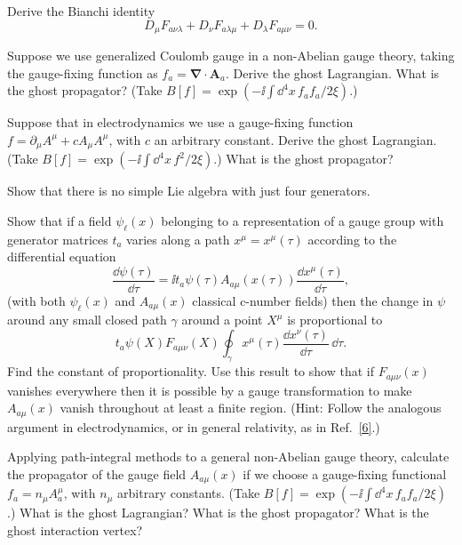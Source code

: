 
\begin{enumerate}
   Derive the Bianchi identity
  \[
    D_\mu F_{a\nu\lambda}+D_\nu F_{a\lambda\mu}
    +D_\lambda F_{a\mu\nu}=0.
  \]

   Suppose we use generalized Coulomb gauge in a non-Abelian gauge theory, taking the gauge-fixing function as $f_a=\boldsymbol\nabla\cdot\mathbf A_a$. Derive the ghost Lagrangian. What is the ghost propagator? (Take $B[f]=\exp(-\ii\int \dd^4x\,f_a f_a/2\xi)$.)

   Suppose that in electrodynamics we use a gauge-fixing function $f=\partial_\mu A^\mu+cA_\mu A^\mu$, with $c$ an arbitrary constant. Derive the ghost Lagrangian.\\
  (Take $B[f]=\exp(-\ii\int \dd^4x\,f^2/2\xi)$.) What is the ghost propagator?

   Show that there is no simple Lie algebra with just four generators.

   Show that if a field $\psi_\ell(x)$ belonging to a representation of a gauge group with generator matrices $t_a$ varies along a path $x^\mu=x^\mu(\tau)$ according to the differential equation
  \[
    \frac{\dd\psi(\tau)}{\dd\tau}
    =\ii t_a\psi(\tau)A_{a\mu}(x(\tau))\frac{\dd x^\mu(\tau)}{\dd\tau},
  \]
  (with both $\psi_\ell(x)$ and $A_{a\mu}(x)$ classical c-number fields) then the change in $\psi$ around any small closed path $\gamma$ around a point $X^\mu$ is proportional to
  \[
    t_a\psi(X)F_{a\mu\nu}(X)
    \oint_\gamma x^\mu(\tau)\frac{\dd x^\nu(\tau)}{\dd\tau}\,\dd\tau.
  \]
  Find the constant of proportionality. Use this result to show that if $F_{a\mu\nu}(x)$ vanishes everywhere then it is possible by a gauge transformation to make $A_{a\mu}(x)$ vanish throughout at least a finite region. (Hint: Follow the analogous argument in electrodynamics, or in general relativity, as in Ref.~\hyperref[ch15-ref-6]{[6]}.)

   Applying path-integral methods to a general non-Abelian gauge theory, calculate the propagator of the gauge field $A_{a\mu}(x)$ if we choose a gauge-fixing functional $f_a=n_\mu A_a^\mu$, with $n_\mu$ arbitrary constants. (Take $B[f]=\exp(-\ii\int \dd^4x\,f_a f_a/2\xi)$.) What is the ghost Lagrangian? What is the ghost propagator? What is the ghost interaction vertex?


\end{enumerate}
